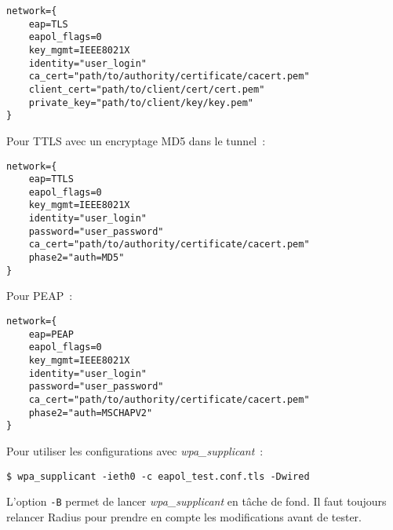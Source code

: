\begin{lstlisting}
network={
    eap=TLS
    eapol_flags=0
    key_mgmt=IEEE8021X
    identity="user_login"
    ca_cert="path/to/authority/certificate/cacert.pem"
    client_cert="path/to/client/cert/cert.pem"
    private_key="path/to/client/key/key.pem"
}
\end{lstlisting}

Pour TTLS avec un encryptage MD5 dans le tunnel~:

\begin{lstlisting}
network={
    eap=TTLS
    eapol_flags=0
    key_mgmt=IEEE8021X
    identity="user_login"
    password="user_password"
    ca_cert="path/to/authority/certificate/cacert.pem"
    phase2="auth=MD5"
}
\end{lstlisting}

Pour PEAP~:

\begin{lstlisting}
network={
    eap=PEAP
    eapol_flags=0
    key_mgmt=IEEE8021X
    identity="user_login"
    password="user_password"
    ca_cert="path/to/authority/certificate/cacert.pem"
    phase2="auth=MSCHAPV2"
}
\end{lstlisting}

Pour utiliser les configurations avec \emph{wpa\_supplicant}~:

\begin{lstlisting}
$ wpa_supplicant -ieth0 -c eapol_test.conf.tls -Dwired
\end{lstlisting}

L'option \texttt{-B} permet de lancer \emph{wpa\_supplicant} en tâche de fond. Il faut toujours relancer Radius pour prendre en compte les modifications avant de tester.
